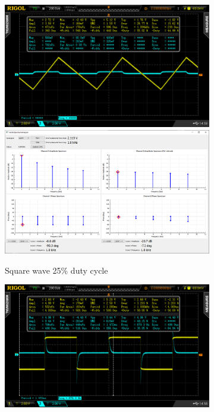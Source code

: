 \documentclass[notitlepage, a4paper, 11pt]{article}
\begin{document}
	\begin{figure}[H]
		\centering
		\begin{subfigure}[][][t]{0.45\textwidth}
			\includegraphics[width=\textwidth, trim=85 50 112 45, clip]{../img/osc/DS2_QuickPrint10.png}
			\includegraphics[width=\textwidth, trim=10 80 10 100, clip]{../img/Circuit2/dut50}
			\caption{Square wave 25\% duty cycle}
		\end{subfigure}
		\begin{subfigure}[][][t]{0.45\textwidth}
			\includegraphics[width=\textwidth, trim=85 50 112 45, clip]{../img/osc/DS2_QuickPrint7.png}

\end{subfigure}
\end{figure}
\end{document}
